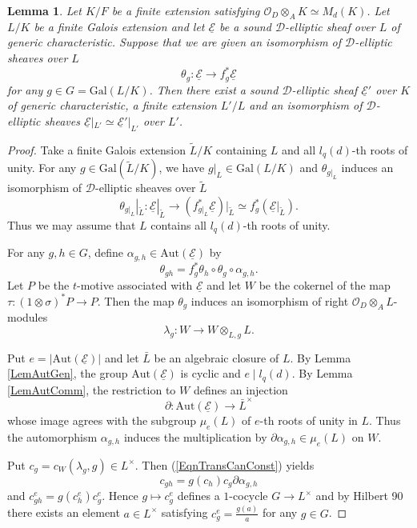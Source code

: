 \documentclass[10pt]{amsart}
\theoremstyle{plain}
\newtheorem{lem}[thm]{Lemma}
\theoremstyle{definition}
\newcommand{\Aut}{\mathrm{Aut}}
\newcommand{\Gal}{\mathrm{Gal}}
\newcommand{\cO}{\mathcal{O}}
\newcommand{\ucE}{\underline{\mathcal{E}}}
\newcommand{\sD}{\mathscr{D}}
\begin{document}
\begin{lem}\label{LemFieldModuli}
	Let $K/F$ be a finite extension satisfying $\cO_D\otimes_A K\simeq M_d(K)$.
	Let $L/K$ be a finite Galois extension %
	and let $\ucE$ be a sound $\sD$-elliptic sheaf over $L$
	of generic characteristic. Suppose that we are given an isomorphism of $\sD$-elliptic sheaves over $L$
	\[
	\theta_g: \ucE\to f_g^*\ucE
	\] 
	for any $g\in G=\Gal(L/K)$. 
	Then there exist a sound $\sD$-elliptic sheaf $\ucE'$ over $K$ of generic characteristic, a finite extension $L'/L$ and
	an isomorphism of $\sD$-elliptic sheaves $\ucE|_{L'}\simeq \ucE'|_{L'}$ over $L'$.
\end{lem}
\begin{proof}
	Take a finite Galois extension $\tilde{L}/K$ containing $L$ and all $l_q(d)$-th roots of unity.
	For any $g\in \Gal(\tilde{L}/K)$, we have $g|_L\in \Gal(L/K)$ and
	$\theta_{g|_L}$ induces an isomorphism of $\sD$-elliptic sheaves over $\tilde{L}$
	\[
	\theta_{g|_L}|_{\tilde{L}}: \ucE|_{\tilde{L}}\to (f_{g|_L}^*\ucE)|_{\tilde{L}}\simeq f_g^*(\ucE|_{\tilde{L}}).
	\] 
	Thus we may assume that $L$ contains all $l_q(d)$-th roots of unity.
	
	
	
	For any $g,h\in G$, define $\alpha_{g,h}\in \Aut(\ucE)$ by
	\[
	\theta_{gh}=f_g^*\theta_h\circ \theta_g\circ \alpha_{g,h}.
	\]
	Let $P$ be the $t$-motive associated with $\ucE$ and let $W$ be the cokernel of the map $\tau:(1\otimes \sigma)^*P\to P$. Then the map $\theta_g$ induces
	an isomorphism of right $\cO_D\otimes_A L$-modules 
	\[
	\lambda_g: W\to W\otimes_{L,g}L.
	\]
	
	Put $e=|\Aut(\ucE)|$ and let $\bar{L}$ be an algebraic closure of $L$. 
	By Lemma \ref{LemAutGen}, the group $\Aut(\ucE)$ is cyclic and $e\mid l_q(d)$.
	By Lemma \ref{LemAutComm}, the restriction to $W$ defines an injection 
	\[
	\partial: \Aut(\ucE)\to \bar{L}^\times
	\]
	whose image agrees with the subgroup $\mu_e(L)$ of $e$-th roots of unity in $L$.
	Thus the automorphism $\alpha_{g,h}$ induces the multiplication by 
	$\partial\alpha_{g,h}\in \mu_{e}(L)$ on $W$. 
	
	Put $c_g=c_W(\lambda_g,g)\in L^\times$. Then (\ref{EqnTransCanConst}) yields
	\[
	c_{gh}=g(c_h)c_g \partial\alpha_{g,h}
	\]
	and $c_{gh}^e=g(c_h^e)c_g^e$. Hence $g\mapsto c_g^e$ defines a $1$-cocycle $G\to L^\times$ and by Hilbert 90 
	there exists an element $a\in L^\times$ satisfying $c_g^e=\frac{g(a)}{a}$ for any $g\in G$. 
	

\end{proof}
\end{document}
